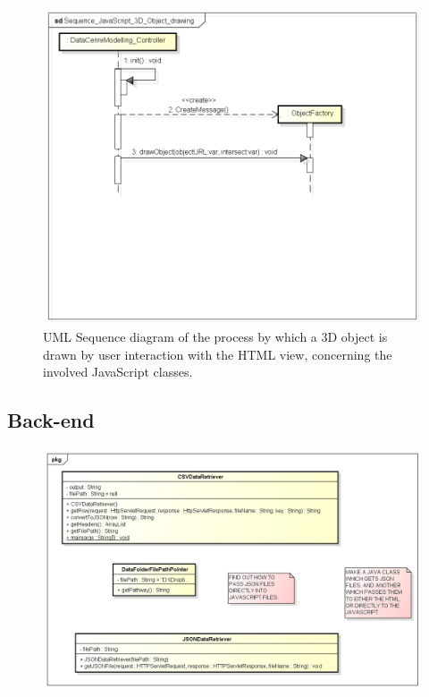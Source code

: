 \begin{figure}[H]
\centering
\includegraphics[width=5in]{Resources//Design_Diagrams//Sequence_JavaScript_3D_Object_drawing.png}
\caption{UML Sequence diagram of the process by which a 3D object is drawn by user interaction with the HTML view, concerning the involved JavaScript classes.}
\label{}
\end{figure}

\subsection{Back-end}

\begin{figure}[H]
\centering
\includegraphics[width=5in]{Resources//Design_Diagrams//Class_Java Back-end.png}
\caption{}
\label{}
\end{figure}

